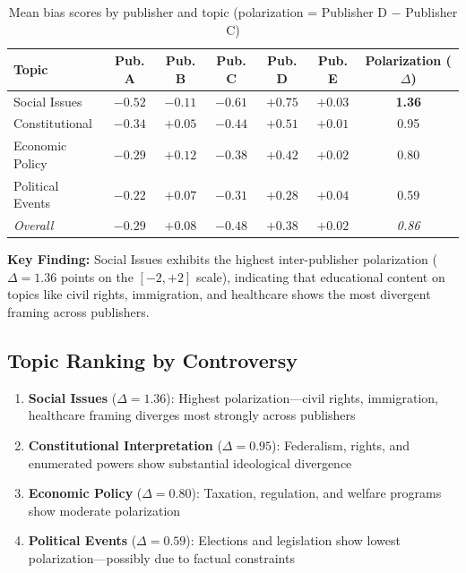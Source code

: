 \documentclass[11pt,a4paper]{article}
\begin{document}
\begin{table}[H]
\centering
\caption{Mean bias scores by publisher and topic (polarization = Publisher D $-$ Publisher C)}
\small
\begin{tabular}{lcccccc}
\toprule
\textbf{Topic} & \textbf{Pub. A} & \textbf{Pub. B} & \textbf{Pub. C} & \textbf{Pub. D} & \textbf{Pub. E} & \textbf{Polarization ($\Delta$)} \\
\midrule
Social Issues & $-0.52$ & $-0.11$ & $-0.61$ & $+0.75$ & $+0.03$ & \textbf{1.36} \\
Constitutional & $-0.34$ & $+0.05$ & $-0.44$ & $+0.51$ & $+0.01$ & 0.95 \\
Economic Policy & $-0.29$ & $+0.12$ & $-0.38$ & $+0.42$ & $+0.02$ & 0.80 \\
Political Events & $-0.22$ & $+0.07$ & $-0.31$ & $+0.28$ & $+0.04$ & 0.59 \\
\textit{Overall} & \textit{$-0.29$} & \textit{$+0.08$} & \textit{$-0.48$} & \textit{$+0.38$} & \textit{$+0.02$} & \textit{0.86} \\
\bottomrule
\end{tabular}
\label{tab:cross-topic}
\end{table}

\textbf{Key Finding:} Social Issues exhibits the highest inter-publisher polarization ($\Delta = 1.36$ points on the $[-2, +2]$ scale), indicating that educational content on topics like civil rights, immigration, and healthcare shows the most divergent framing across publishers.

\subsection{Topic Ranking by Controversy}

\begin{enumerate}
    \item \textbf{Social Issues} ($\Delta = 1.36$): Highest polarization---civil rights, immigration, healthcare framing diverges most strongly across publishers
    \item \textbf{Constitutional Interpretation} ($\Delta = 0.95$): Federalism, rights, and enumerated powers show substantial ideological divergence
    \item \textbf{Economic Policy} ($\Delta = 0.80$): Taxation, regulation, and welfare programs show moderate polarization
    \item \textbf{Political Events} ($\Delta = 0.59$): Elections and legislation show lowest polarization---possibly due to factual constraints
\end{enumerate}
\end{document}
